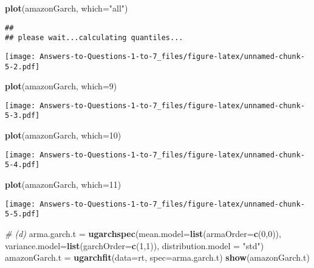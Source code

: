 \documentclass[
]{article}
\newenvironment{Shaded}{\begin{snugshade}}{\end{snugshade}}
\newcommand{\AttributeTok}[1]{\textcolor[rgb]{0.13,0.29,0.53}{#1}}
\newcommand{\CommentTok}[1]{\textcolor[rgb]{0.56,0.35,0.01}{\textit{#1}}}
\newcommand{\DecValTok}[1]{\textcolor[rgb]{0.00,0.00,0.81}{#1}}
\newcommand{\FunctionTok}[1]{\textcolor[rgb]{0.13,0.29,0.53}{\textbf{#1}}}
\newcommand{\NormalTok}[1]{#1}
\newcommand{\OtherTok}[1]{\textcolor[rgb]{0.56,0.35,0.01}{#1}}
\newcommand{\StringTok}[1]{\textcolor[rgb]{0.31,0.60,0.02}{#1}}
\begin{document}
\begin{Shaded}
\begin{Highlighting}[]
\FunctionTok{plot}\NormalTok{(amazonGarch, }\AttributeTok{which=}\StringTok{"all"}\NormalTok{)}
\end{Highlighting}
\end{Shaded}

\begin{verbatim}
## 
## please wait...calculating quantiles...
\end{verbatim}

\texttt{[image: Answers-to-Questions-1-to-7\_files/figure-latex/unnamed-chunk-5-2.pdf]}

\begin{Shaded}
\begin{Highlighting}[]
\FunctionTok{plot}\NormalTok{(amazonGarch, }\AttributeTok{which=}\DecValTok{9}\NormalTok{)}
\end{Highlighting}
\end{Shaded}

\texttt{[image: Answers-to-Questions-1-to-7\_files/figure-latex/unnamed-chunk-5-3.pdf]}

\begin{Shaded}
\begin{Highlighting}[]
\FunctionTok{plot}\NormalTok{(amazonGarch, }\AttributeTok{which=}\DecValTok{10}\NormalTok{)}
\end{Highlighting}
\end{Shaded}

\texttt{[image: Answers-to-Questions-1-to-7\_files/figure-latex/unnamed-chunk-5-4.pdf]}

\begin{Shaded}
\begin{Highlighting}[]
\FunctionTok{plot}\NormalTok{(amazonGarch, }\AttributeTok{which=}\DecValTok{11}\NormalTok{)}
\end{Highlighting}
\end{Shaded}

\texttt{[image: Answers-to-Questions-1-to-7\_files/figure-latex/unnamed-chunk-5-5.pdf]}

\begin{Shaded}
\begin{Highlighting}[]
\CommentTok{\# (d)}
\NormalTok{arma.garch.t }\OtherTok{=} \FunctionTok{ugarchspec}\NormalTok{(}\AttributeTok{mean.model=}\FunctionTok{list}\NormalTok{(}\AttributeTok{armaOrder=}\FunctionTok{c}\NormalTok{(}\DecValTok{0}\NormalTok{,}\DecValTok{0}\NormalTok{)),}
\AttributeTok{variance.model=}\FunctionTok{list}\NormalTok{(}\AttributeTok{garchOrder=}\FunctionTok{c}\NormalTok{(}\DecValTok{1}\NormalTok{,}\DecValTok{1}\NormalTok{)),}
\AttributeTok{distribution.model =} \StringTok{"std"}\NormalTok{)}
\NormalTok{amazonGarch.t }\OtherTok{=} \FunctionTok{ugarchfit}\NormalTok{(}\AttributeTok{data=}\NormalTok{rt, }\AttributeTok{spec=}\NormalTok{arma.garch.t)}
\FunctionTok{show}\NormalTok{(amazonGarch.t)}
\end{Highlighting}
\end{Shaded}
\end{document}
